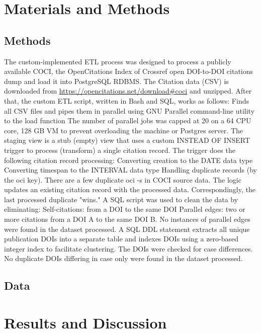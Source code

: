 \documentclass[12pt, oneside]{article}   	%
\begin{document}
\section{Materials and Methods}
	
\subsection{Methods} 

The custom-implemented ETL process was designed to process a publicly available COCI, the OpenCitations Index of Crossref open DOI-to-DOI citations dump and load it into PostgreSQL RDBMS. 
The Citation data (CSV) is downloaded from \url{https://opencitations.net/download#coci} and unzipped. After that, the custom ETL script, written in Bash and SQL, works as follows:
Finds all CSV files and pipes them in parallel using GNU Parallel command-line utility to the load function
The number of parallel jobs was capped at 20 on a 64 CPU core, 128 GB VM to prevent overloading the machine or Postgres server.
The staging view is a stub (empty) view that uses a custom INSTEAD OF INSERT trigger to process (transform) a single citation record.
The trigger does the following citation record processing:
Converting creation to the DATE data type
Converting timespan to the INTERVAL data type
Handling duplicate records (by the oci key). There are a few duplicate oci -s in COCI source data. The logic updates an existing citation record with the processed data. Correspondingly, the last processed duplicate "wins."
A SQL script was used to clean the data by eliminating:
Self-citations: from a DOI to the same DOI
Parallel edges: two or more citations from a DOI A to the same DOI B. No instances of parallel edges were found in the dataset processed.
A SQL DDL statement extracts all unique publication DOIs into a separate table and indexes DOIs using a zero-based integer index to facilitate clustering.
The DOIs were checked for case differences. No duplicate DOIs differing in case only were found in the dataset processed.
\subsection{Data} 
\section{Results and Discussion}
	
\end{document}
